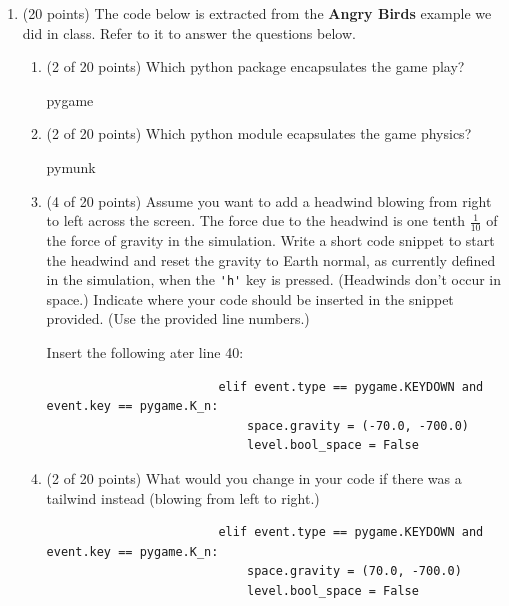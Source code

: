 \documentclass[10pt]{article}
\begin{document}
\begin{enumerate}
	\item (20 points) The code below is extracted from the \textbf{Angry Birds} example we did 
		in class. Refer to it to answer the questions below.


		

		\newpage

		\beginanswers
		\begin{enumerate}

			\newpage

			\item (2 of 20 points) Which python package encapsulates the game play?

				\bigskip
				pygame
				\bigskip

			\item (2 of 20 points) Which python module ecapsulates the game physics?

				\bigskip
				pymunk
				\bigskip

			\item (4 of 20 points) Assume you want to add a 
				headwind blowing from right to left across the 
				screen. The force due to the headwind is one 
				tenth $\frac{1}{10}$ of the force of gravity in 
				the simulation. Write a short code snippet to 
				start the headwind and reset the gravity to Earth 
				normal, as currently defined in the simulation, 
				when the \verb|'h'| key is pressed. (Headwinds 
				don't occur in space.) Indicate where your code 
				should be inserted in the snippet provided. (Use 
				the provided line numbers.)

				\bigskip
				Insert the following ater line 40:
				\begin{lstlisting}
               			elif event.type == pygame.KEYDOWN and event.key == pygame.K_n:
                   			space.gravity = (-70.0, -700.0)
                   			level.bool_space = False
				\end{lstlisting}
				\bigskip
			
			\item (2 of 20 points) What would you change in your code if there was a tailwind 
				instead (blowing 
				from left to right.)

				\bigskip
				\begin{lstlisting}
               			elif event.type == pygame.KEYDOWN and event.key == pygame.K_n:
                   			space.gravity = (70.0, -700.0)
                   			level.bool_space = False
				\end{lstlisting}
				\bigskip


\end{enumerate}
\end{enumerate}
\end{document}
